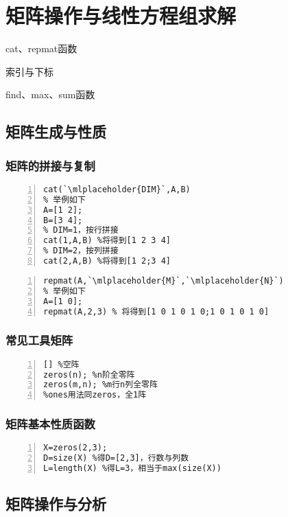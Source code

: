 \chapter{矩阵操作与线性方程组求解}
\begin{introduction}
\item cat、repmat函数
\item 索引与下标
\item find、max、sum函数
\end{introduction}



\section{矩阵生成与性质}
\subsection{矩阵的拼接与复制}
\begin{lstlisting}[frame=single,numbers=left]
% 拼接矩阵
cat(`\mlplaceholder{DIM}`,A,B)
% 举例如下
A=[1 2];
B=[3 4];
% DIM=1，按行拼接
cat(1,A,B) %将得到[1 2 3 4]
% DIM=2，按列拼接
cat(2,A,B) %将得到[1 2;3 4]
\end{lstlisting}

\begin{lstlisting}[frame=single,numbers=left]
% 将矩阵A复制M行N列
repmat(A,`\mlplaceholder{M}`,`\mlplaceholder{N}`)
% 举例如下
A=[1 0];
repmat(A,2,3) % 将得到[1 0 1 0 1 0;1 0 1 0 1 0]
\end{lstlisting}
\subsection{常见工具矩阵}
\begin{lstlisting}[frame=single,numbers=left]
[] %空阵
zeros(n); %n阶全零阵
zeros(m,n); %m行n列全零阵
%ones用法同zeros，全1阵
\end{lstlisting}

\subsection{矩阵基本性质函数}
\begin{lstlisting}[frame=single,numbers=left]
% size函数与length函数
X=zeros(2,3);
D=size(X) %得D=[2,3]，行数与列数
L=length(X) %得L=3，相当于max(size(X))
\end{lstlisting}
\section{矩阵操作与分析}
